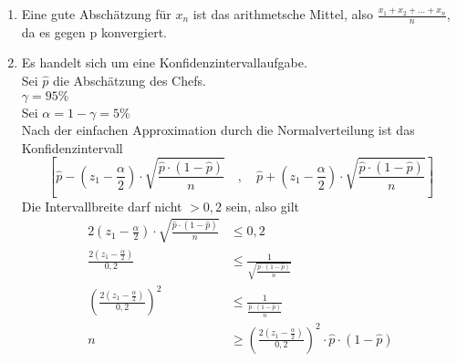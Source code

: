 \documentclass[11pt,a4paper]{article}
\begin{document}
      \begin{enumerate}
        \item Eine gute Abschätzung für $x_n$ ist das arithmetsche Mittel, also $\frac{x_1+x_2+\dots+x_n}{n}$, da es gegen p konvergiert.
        \item Es handelt sich um eine Konfidenzintervallaufgabe.\\
        Sei $\hat{p}$ die Abschätzung des Chefs.\\
        $\gamma=95\%$\\
        Sei $\alpha=1-\gamma=5\%$\\
        Nach der einfachen Approximation durch die Normalverteilung ist das Konfidenzintervall\\
        \begin{equation*}
          \left[ \hat{p} -\left(z_1-\frac{\alpha}{2}\right)\cdot \sqrt{\frac{\hat p \cdot \left(1-\hat{p}\right)}{n}}\quad ,\quad \hat p + \left(z_1-\frac{\alpha}{2}\right)\cdot \sqrt{\frac{\hat p \cdot \left(1-\hat{p}\right)}{n}} \right]
        \end{equation*}
        Die Intervallbreite darf nicht $>0,2$ sein, also gilt\\
        \begin{align*}
          2 \left(z_1-\frac{\alpha}{2}\right)\cdot \sqrt{\frac{\hat p \cdot \left(1-\hat{p}\right)}{n}} &\leq 0,2\\
          \frac{2\left(z_1-\frac{\alpha}{2}\right)}{0,2} &\leq \frac{1}{\sqrt{\frac{\hat p \cdot \left( 1- \hat p \right)}{n}}}\\
          \left( \frac{2\left(z_1-\frac{\alpha}{2}\right)}{0,2} \right)^2 & \leq \frac{1}{\frac{\hat p \cdot \left( 1- \hat p \right)}{n}}\\
          n &\geq \left( \frac{2\left(z_1-\frac{\alpha}{2}\right)}{0,2} \right)^2 \cdot \hat p \cdot \left( 1 - \hat p \right)
        \end{align*}
      \end{enumerate}
\end{document}
